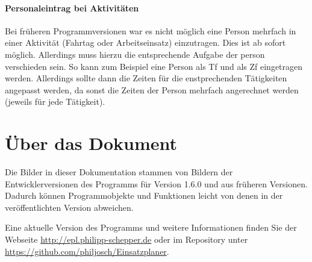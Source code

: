\paragraph{Personaleintrag bei Aktivitäten}
Bei früheren Programmversionen war es nicht möglich eine Person mehrfach in einer Aktivität (Fahrtag oder Arbeitseinsatz) einzutragen.
Dies ist ab sofort möglich.
Allerdings muss hierzu die entsprechende Aufgabe der person verschieden sein.
So kann zum Beispiel eine Person als Tf und als Zf eingetragen werden.
Allerdings sollte dann die Zeiten für die enstprechenden Tätigkeiten angepasst werden,
da sonst die Zeiten der Person mehrfach angerechnet werden (jeweils für jede Tätigkeit).




\section{Über das Dokument}
Die Bilder in dieser Dokumentation stammen von Bildern der Entwicklerversionen des Programms für Version 1.6.0 und aus früheren Versionen.
Dadurch können Programmobjekte und Funktionen leicht von denen in der veröffentlichten Version abweichen.

Eine aktuelle Version des Programms und weitere Informationen finden Sie der Webseite \url{http://epl.philipp-schepper.de}
oder im Repository unter \url{https://github.com/philjosch/Einsatzplaner}.
